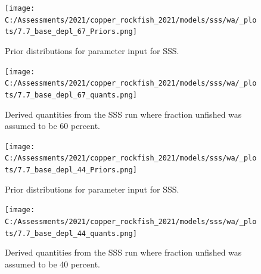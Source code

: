 \documentclass[11pt,
  english,
  a4paper,
]{article}
\begin{document}
\tagmcend\tagstructend

\newpage


\begin{figure}
\centering
\texttt{[image: C:/Assessments/2021/copper\_rockfish\_2021/models/sss/wa/\_plots/7.7\_base\_depl\_67\_Priors.png]}
\caption{Prior distributions for parameter input for SSS.\label{fig:sss-prior-67}}
\end{figure}

\tagmcend\tagstructend

\newpage


\begin{figure}
\centering
\texttt{[image: C:/Assessments/2021/copper\_rockfish\_2021/models/sss/wa/\_plots/7.7\_base\_depl\_67\_quants.png]}
\caption{Derived quantities from the SSS run where fraction unfished was assumed to be 60 percent.\label{fig:sss-quant-67}}
\end{figure}

\tagmcend\tagstructend

\newpage


\begin{figure}
\centering
\texttt{[image: C:/Assessments/2021/copper\_rockfish\_2021/models/sss/wa/\_plots/7.7\_base\_depl\_44\_Priors.png]}
\caption{Prior distributions for parameter input for SSS.\label{fig:sss-prior-44}}
\end{figure}

\tagmcend\tagstructend

\newpage


\begin{figure}
\centering
\texttt{[image: C:/Assessments/2021/copper\_rockfish\_2021/models/sss/wa/\_plots/7.7\_base\_depl\_44\_quants.png]}
\caption{Derived quantities from the SSS run where fraction unfished was assumed to be 40 percent.\label{fig:sss-quant-44}}
\end{figure}

\tagmcend\tagstructend

\newpage

\end{document}
